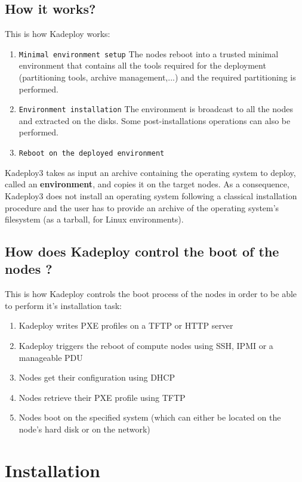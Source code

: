 \documentclass[a4wide,10pt,oneside]{book}
\begin{document}
\section{How it works?}
This is how Kadeploy works:
\begin{enumerate}
  \item \texttt{Minimal environment setup}
  The nodes reboot into a trusted minimal environment that contains all the tools required for the deployment (partitioning tools, archive management,...) and the required partitioning is performed.
  \item \texttt{Environment installation}
  The environment is broadcast to all the nodes and extracted on the disks. Some post-installations operations can also be performed.
  \item \texttt{Reboot on the deployed environment}
\end{enumerate}

Kadeploy3 takes as input an archive containing the operating system to
deploy, called an \textbf{environment}, and copies it on the target nodes. As a
consequence, Kadeploy3 does not install an operating system following a
classical installation procedure and the user has to provide an archive of
the operating system's filesystem (as a tarball, for Linux environments).


\section{How does Kadeploy control the boot of the nodes ?}
This is how Kadeploy controls the boot process of the nodes in order to be able to perform it's installation task:
\begin{enumerate}
  \item Kadeploy writes PXE profiles on a TFTP or HTTP server
  \item Kadeploy triggers the reboot of compute nodes using SSH, IPMI or a manageable PDU
  \item Nodes get their configuration using DHCP
  \item Nodes retrieve their PXE profile using TFTP
  \item Nodes boot on the specified system (which can either be located on the node's hard disk or on the network)
\end{enumerate}



\chapter{Installation}\label{chap:Installation}
\end{document}
